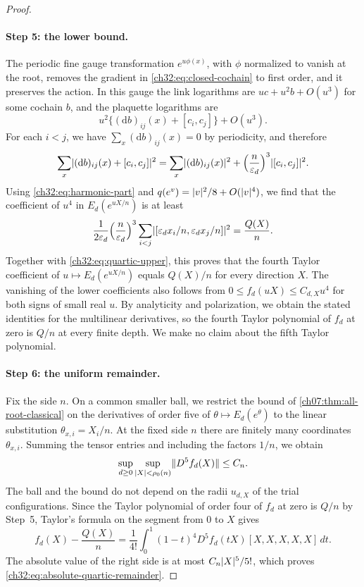 \begin{proof}
\paragraph{Step 5: the lower bound.}
The periodic fine gauge transformation $e^{u\phi(x)}$, with $\phi$ normalized to vanish at the root, removes the gradient in \eqref{ch32:eq:closed-cochain} to first order, and it preserves the action. In this gauge the link logarithms are $uc+u^2b+O(u^3)$ for some cochain $b$, and the plaquette logarithms are
\[
 u^2\bigl\{(\mathrm db)_{ij}(x)+[c_i,c_j]\bigr\}+O(u^3).
\]
For each $i<j$, we have $\sum_x(\mathrm db)_{ij}(x)=0$ by periodicity, and therefore
\[
 \sum_x\lvert (\mathrm db)_{ij}(x)+[c_i,c_j]\rvert^2=\sum_x\lvert (\mathrm db)_{ij}(x)\rvert^2+\Bigl(\frac n{\varepsilon_d}\Bigr)^3\lvert [c_i,c_j]\rvert^2.
\]
Using \eqref{ch32:eq:harmonic-part} and $q(e^v)=\lvert v\rvert^2/8+O(\lvert v\rvert^4)$, we find that the coefficient of $u^4$ in $E_d(e^{uX/n})$ is at least
\[
 \frac1{2\varepsilon_d}\Bigl(\frac n{\varepsilon_d}\Bigr)^3\sum_{i<j}\lvert [\varepsilon_dx_i/n,\varepsilon_dx_j/n]\rvert^2=\frac{Q(X)}n.
\]
Together with \eqref{ch32:eq:quartic-upper}, this proves that the fourth Taylor coefficient of $u\mapsto E_d(e^{uX/n})$ equals $Q(X)/n$ for every direction $X$. The vanishing of the lower coefficients also follows from $0\le f_d(uX)\le C_{d,X}u^4$ for both signs of small real $u$. By analyticity and polarization, we obtain the stated identities for the multilinear derivatives, so the fourth Taylor polynomial of $f_d$ at zero is $Q/n$ at every finite depth. We make no claim about the fifth Taylor polynomial.

\paragraph{Step 6: the uniform remainder.}
Fix the side $n$. On a common smaller ball, we restrict the bound of \cref{ch07:thm:all-root-classical} on the derivatives of order five of $\theta\mapsto E_d(e^\theta)$ to the linear substitution $\theta_{x,i}=X_i/n$. At the fixed side $n$ there are finitely many coordinates $\theta_{x,i}$. Summing the tensor entries and including the factors $1/n$, we obtain
\[
 \sup_{d\ge0}\sup_{\lvert X\rvert<\rho_0(n)}\lVert D^5f_d(X)\rVert\le C_n.
\]
The ball and the bound do not depend on the radii $u_{d,X}$ of the trial configurations. Since the Taylor polynomial of order four of $f_d$ at zero is $Q/n$ by Step~5, Taylor's formula on the segment from $0$ to $X$ gives
\[
 f_d(X)-\frac{Q(X)}n=\frac1{4!}\int_0^1(1-t)^4D^5f_d(tX)[X,X,X,X,X]\,dt.
\]
The absolute value of the right side is at most $C_n\lvert X\rvert^5/5!$, which proves \eqref{ch32:eq:absolute-quartic-remainder}.
\end{proof}

